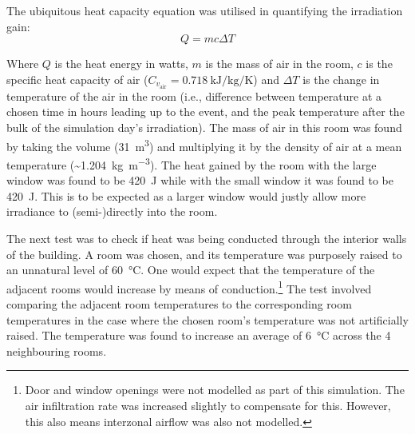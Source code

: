 The ubiquitous heat capacity equation was utilised in quantifying the irradiation gain: 
\begin{equation}
    Q = mc\Delta T 
\end{equation} 

Where $Q$ is the heat energy in watts, $m$ is the mass of air in the room, $c$ is the specific heat capacity of air ($C_{v_\text{air}} = \qty{0.718}{\kilo\joule\per\kilo\gram\per\kelvin}$) and $\Delta T$ is the change in temperature of the air in the room (i.e., difference between temperature at a chosen time in hours leading up to the event, and the peak temperature after the bulk of the simulation day's irradiation). The mass of air in this room was found by taking the volume (\qty{31}{\meter\cubed}) and multiplying it by the density of air at a mean temperature (\sim \qty{1.204}{\kilo\gram\per\cubic\meter}). 
The heat gained by the room with the large window was found to be \qty{420}{\joule} while with the small window it was found to be \qty{420}{\joule}. This is to be expected as a larger window would justly allow more irradiance to (semi-)directly into the room. 

The next test was to check if heat was being conducted through the interior walls of the building. A room was chosen, and its temperature was purposely raised to an unnatural level of \qty{60}{\celsius}. One would expect that the temperature of the adjacent rooms would increase by means of conduction.\footnote{Door and window openings were not modelled as part of this simulation. The air infiltration rate was increased slightly to compensate for this. However, this also means interzonal airflow was also not modelled.} The test involved comparing the adjacent room temperatures to the corresponding room temperatures in the case where the chosen room's temperature was not artificially raised. The temperature was found to increase an average of \qty{6}{\celsius} across the 4 neighbouring rooms. 


